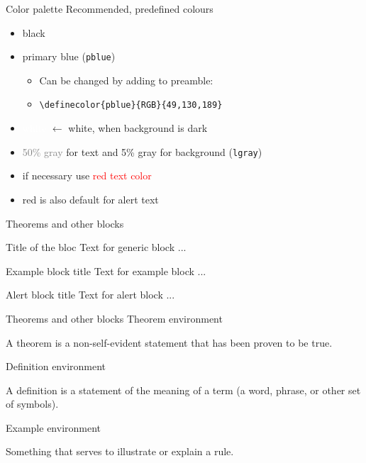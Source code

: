 \documentclass[10pt,t]{beamer}
\begin{document}
\begin{frame}{Color palette}\label{colorpalette}
Recommended, predefined colours
\begin{itemize}
	\item black
	\item \textcolor{pblue}{primary blue} (\texttt{pblue})
	\begin{itemize}
	    \item Can be changed by adding to preamble:
	    \item[ ] \texttt{\textbackslash definecolor\{pblue\}\{RGB\}\{49,130,189\}}
	\end{itemize}
	\item \textcolor{white}{white} $\leftarrow$ white, when background is dark
	\item \textcolor{gray}{50\% gray } for text and \textcolor{lgray}{5\% gray} for background (\texttt{lgray})

	\vspace{5mm}
	\item if necessary use \textcolor{red}{red text color}  
	\item red is also default for \alert{alert text}
\end{itemize}
\end{frame} 



\begin{frame}{Theorems and other blocks}
	\begin{block}{Title of the bloc}
	Text for generic block ...
	\end{block}

\vspace{11pt}
	\begin{exampleblock}{Example block title}
	Text for example block ...
	\end{exampleblock}

\vspace{11pt}
	\begin{alertblock}{Alert block title}
	Text for alert block ...
	\end{alertblock}
\end{frame}




\begin{frame}{Theorems and other blocks}
Theorem environment
	\begin{theorem}
	A theorem is a non-self-evident statement that has been proven to be true.
	\end{theorem}

\vspace{11pt}
Definition environment
	\begin{definition}
	A definition is a statement of the meaning of a term (a word, phrase, or other set of symbols).
	\end{definition}

\vspace{11pt}	
Example environment
	\begin{example}
	Something that serves to illustrate or explain a rule.
	\end{example}
\end{frame}
\end{document}
